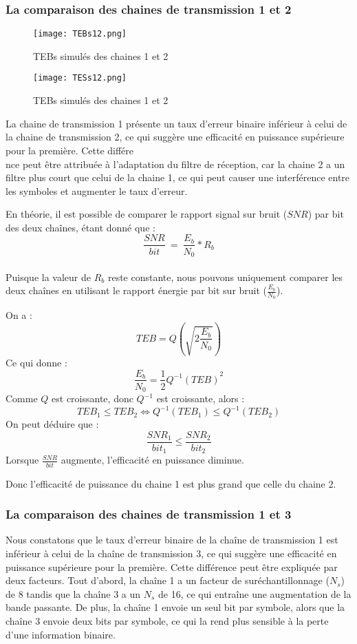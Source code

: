 \documentclass[11pt]{article}
\begin{document}
\subsubsection{La comparaison des chaines de transmission 1 et 2} 
\begin{figure}[ht!]
            \centering
            \texttt{[image: TEBs12.png]}
            \caption{TEBs simulés des chaines 1 et 2
            \label{fig : TEBS12}}
\end{figure}
\begin{figure}[ht!]
            \centering
            \texttt{[image: TESs12.png]}
            \caption{TEBs simulés des chaines 1 et 2
            \label{fig : TESS12}}
\end{figure}

La chaine de transmission 1 présente un taux d'erreur binaire inférieur à celui de la chaine de transmission 2, ce qui suggère une efficacité en puissance supérieure pour la première. Cette différe\\nce peut être attribuée à l'adaptation du filtre de réception, car la chaine 2 a un filtre plus court que celui de la chaine 1, ce qui peut causer une interférence entre les symboles et augmenter le taux d'erreur.

En théorie, il est possible de comparer le rapport signal sur bruit ($SNR$) par bit des deux chaînes, étant donné que :
$$ \frac{SNR}{bit} \ = \ \frac{E_{b}}{N_{0}} * R_{b} $$ \\
Puisque la valeur de $R_b$ reste constante, nous pouvons uniquement comparer les deux chaînes en utilisant le rapport énergie par bit sur bruit ($\frac{E_b}{N_0}$).

On a :
$$TEB = Q( \sqrt{2\frac{E_{b}}{N_{0}}}) $$
Ce qui donne :
$$ \frac{E_{b}}{N_{0}} = \frac{1}{2} {Q^{-1}(TEB)}^{2} $$
Comme $Q$ est croissante, donc $Q^{-1}$ est croissante, alors :
$$ TEB_{1} \leq TEB_{2} \iff {Q^{-1}(TEB_{1})} \leq {Q^{-1}(TEB_{2})} $$
On peut déduire que :
$$ \frac{SNR_1}{bit_{1}} \leq \frac{SNR_2}{bit_{2}} $$
Lorsque $\frac{SNR}{bit}$ augmente, l'efficacité en puissance diminue.

Donc l'efficacité de puissance du chaine 1 est plus grand que celle du chaine 2.

\newpage
\subsubsection{La comparaison des chaines de transmission 1 et 3}
Nous constatons que le taux d'erreur binaire de la chaîne de transmission 1 est inférieur à celui de la chaîne de transmission 3, ce qui suggère une efficacité en puissance supérieure pour la première. Cette différence peut être expliquée par deux facteurs. Tout d'abord, la chaîne 1 a un facteur de suréchantillonnage ($N_s$) de 8 tandis que la chaîne 3 a un $N_s$ de 16, ce qui entraîne une augmentation de la bande passante. De plus, la chaîne 1 envoie un seul bit par symbole, alors que la chaîne 3 envoie deux bits par symbole, ce qui la rend plus sensible à la perte d'une information binaire.
\end{document}
